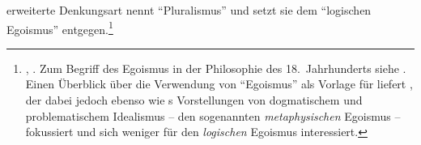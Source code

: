 erweiterte Denkungsart nennt  \enquote{Pluralismus} und setzt sie dem \enquote{logischen Egoismus}
entgegen.\footnote{\cite[Vgl.][\S~2]{Kant:AnthropologieinpragmatischerHinsicht1977},
\cite[][VII: 128.21--130.21]{Kant:GesammelteWerke1900ff.}. Zum Begriff des
Egoismus in der Philosophie des 18.\ Jahrhunderts siehe
\cite[][200--227]{Halbfass:DescartesFragenachderExistenzderWelt1968}. Einen
 Überblick über die Verwendung von \enquote{Egoismus} als Vorlage für
  liefert
 \textcite[vgl.][15--46]{Heidemann:KantunddasProblemdesmetaphysischenIdealismus1998},
 der dabei jedoch ebenso wie  s
 Vorstellungen von dogmatischem und problematischem Idealismus -- den
 sogenannten \emph{metaphysischen} Egoismus -- fokussiert und sich weniger für
 den \emph{logischen} Egoismus interessiert.}


